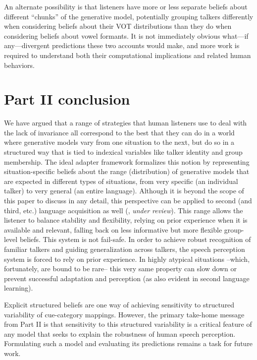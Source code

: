 An alternate possibility is that listeners have more or less separate beliefs about different ``chunks'' of the generative model, potentially grouping talkers differently when considering beliefs about their VOT distributions than they do when considering beliefs about vowel formants.  It is not immediately obvious what---if any---divergent predictions these two accounts would make, and more work is required to understand both their computational implications and related human behaviors.

\label{r1-cluster-questions-end}

\section{Part II conclusion}
\label{sec:part-ii-conclusion}

We have argued that a range of strategies that human listeners use to deal with the lack of invariance all correspond to the best that they can do in a world where generative models vary from one situation to the next, but do so in a structured way that is tied to indexical variables like talker identity and group membership.  The ideal adapter framework formalizes this notion by representing situation-specific beliefs about the range (distribution) of generative models that are expected in different types of situations, from very specific (an individual talker) to very general (an entire language).%
Although it is beyond the scope of this paper to discuss in any detail, this perspective can be applied to second (and third, etc.) language acquisition as well (\citeauthor{PajakSubmitted}, \emph{under review}).
This range allows the listener to balance stability and flexibility, relying on prior experience when it is available and relevant, falling back on less informative but more flexible group-level beliefs. This system is not fail-safe. In order to achieve robust recognition of familiar talkers and guiding generalization across talkers, the speech perception system is forced to rely on prior experience. In highly atypical situations --which, fortunately, are bound to be rare-- this very same property can slow down or prevent successful adaptation and perception (as also evident in second language learning). 

Explicit structured beliefs are one way of achieving sensitivity to structured variability of cue-category mappings. However, the primary take-home message from Part II is that sensitivity to this structured variability is a critical feature of any model that seeks to explain the robustness of human speech perception.  Formulating such a model and evaluating its predictions remains a task for future work.


